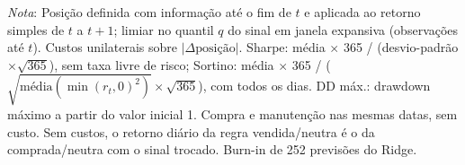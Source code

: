 \begin{table}[H]
\centering
\small
\caption{Estratégias com o BVRP previsto pelo Ridge (quantil 80\%, 27/02/2024 a 02/03/2026, 735 dias).}
\label{tab:estr-principal}
\par\smallskip
\parbox{0.95\linewidth}{\footnotesize\textit{Nota}: Posição definida com informação até o fim de $t$ e aplicada ao retorno simples de $t$ a $t+1$; limiar no quantil $q$ do sinal em janela expansiva (observações até $t$). Custos unilaterais sobre $|\Delta \text{posição}|$. Sharpe: média $\times$ 365 / (desvio-padrão $\times \sqrt{365}$), sem taxa livre de risco; Sortino: média $\times$ 365 / ($\sqrt{\text{média}(\min(r_t, 0)^2)} \times \sqrt{365}$), com todos os dias. DD máx.: drawdown máximo a partir do valor inicial 1. Compra e manutenção nas mesmas datas, sem custo. Sem custos, o retorno diário da regra vendida/neutra é o da comprada/neutra com o sinal trocado. Burn-in de 252 previsões do Ridge.}
\end{table}

